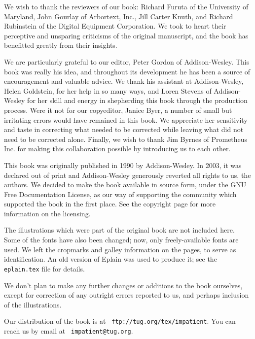 We wish to thank the reviewers of our book: Richard Furuta of the
University of Maryland, John Gourlay of Arbortext, Inc., Jill Carter
Knuth, and Richard Rubinstein of the Digital Equipment Corporation. We
took to heart their perceptive and unsparing criticisms of the original
manuscript, and the book has benefitted greatly from their insights.

We are particularly grateful to our editor, Peter Gordon of
Addison-Wesley.  This book was really his idea, and throughout its
development he has been a source of encouragement and valuable
advice.  We thank his assistant at Addison-Wesley, Helen Goldstein, for
her help in so many ways, and Loren Stevens of Addison-Wesley for her
skill and energy in shepherding this book through the production
process.  Were it not for our copyeditor, Janice Byer, a number of small
but irritating errors would have remained in this book.  We appreciate
her sensitivity and taste in correcting what needed to be corrected
while leaving what did not need to be corrected alone.  Finally, we wish
to thank Jim Byrnes of Prometheus Inc. for making this collaboration
possible by introducing us to each other.
\baselineskip


\baselineskip

 This book was originally
published in 1990 by Addison-Wesley.  In 2003, it was declared out of
print and Addison-Wesley generously reverted all rights to us, the
authors.  We decided to make the book available in source form, under
the GNU Free Documentation License, as our way of supporting the
community which supported the book in the first place.  See the
copyright page for more information on the licensing.

The illustrations which were part of the original book are not included
here.  Some of the fonts have also been changed; now, only
freely-available fonts are used.  We left the cropmarks and galley
information on the pages, to serve as identification.  An old version of
Eplain was used to produce it; see the {\tt eplain.tex} file for
details.

We don't plan to make any further changes or additions to the book
ourselves, except for correction of any outright errors reported to us,
and perhaps inclusion of the illustrations.

Our distribution of the book is at {\tt
ftp://tug.org/tex/impatient}.  You can reach us by email at {\tt
impatient@tug.org}.

\pagebreak
\byebye
